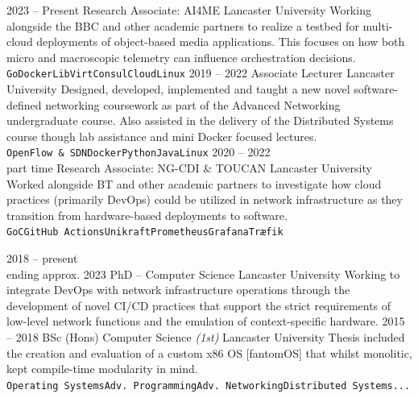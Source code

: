\documentclass[9pt]{developercv} %
\begin{document}
\begin{entrylist}
	\entry
	{2023 -- Present}
	{Research Associate: AI4ME}
	{Lancaster University}
	{Working alongside the BBC and other academic partners to realize a testbed
		for multi-cloud deployments of object-based media applications. This focuses
		on how both micro and macroscopic telemetry can influence orchestration decisions.\\
		\texttt{Go}\slashsep\texttt{Docker}\slashsep\texttt{LibVirt}\slashsep\texttt{Consul}\slashsep\texttt{Cloud}\slashsep\texttt{Linux}}
	\entry
	{2019 -- 2022}
	{Associate Lecturer}
	{Lancaster University}
	{Designed, developed, implemented and taught a new novel software-defined
		networking coursework as part of the Advanced Networking undergraduate course.
		Also assisted in the delivery of the Distributed Systems course though lab
		assistance and mini Docker focused lectures.
		\\
		\texttt{OpenFlow \& SDN}\slashsep\texttt{Docker}\slashsep\texttt{Python}\slashsep\texttt{Java}\slashsep\texttt{Linux}}
	\entry
	{2020 -- 2022\\\footnotesize{part time}}
	{Research Associate: NG-CDI \& TOUCAN}
	{Lancaster University}
	{Worked alongside BT and other academic partners to investigate how cloud
		practices (primarily DevOps) could be utilized in network infrastructure as
		they transition from hardware-based deployments to software.\\
		\texttt{Go}\slashsep\texttt{C}\slashsep\texttt{GitHub Actions}\slashsep\texttt{Unikraft}\slashsep\texttt{Prometheus}\slashsep\texttt{Grafana}\slashsep\texttt{Træfik}}
\end{entrylist}


\vspace{-1em}

\begin{entrylist}
	\entry
	{2018 -- present\\\footnotesize{ending approx. 2023}}
	{PhD -- Computer Science}
	{Lancaster University}
	{Working to integrate DevOps with network infrastructure operations through the
		development of novel CI/CD practices that support the strict requirements of
		low-level network functions and the emulation of context-specific hardware.}
	\entry
	{2015 -- 2018}
	{BSc (Hons) Computer Science \textit{(1st)}}
	{Lancaster University}
	{Thesis included the creation and evaluation of a custom x86 OS [fantomOS] that whilst
		monolitic, kept compile-time modularity in
		mind.\\\texttt{Operating Systems}\slashsep\texttt{Adv.
			Programming}\slashsep\texttt{Adv. Networking}\slashsep\texttt{Distributed Systems}\slashsep\texttt{...}}
\end{entrylist}
\end{document}
